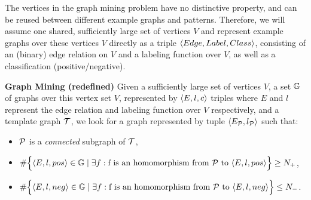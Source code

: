 
The vertices in the graph mining problem have no distinctive property, and can be reused between different example graphs and patterns.
Therefore, we will assume one shared, sufficiently large set of vertices $V$ and represent example graphs over these vertices $V$ directly as a triple $\langle Edge, Label, Class \rangle$, consisting of an (binary) edge relation on $V$ and a labeling function over $V$, as well as a classification (positive/negative).

\begin{definition} \textbf{Graph Mining (redefined)}
\label{def:gm2}
Given a sufficiently large set of vertices $V$, a set $\mathbb{G}$ of graphs over this vertex set $V$, represented by $\langle E, l, c \rangle$ triples
where $E$ and $l$ represent the edge relation and labeling function over $V$ respectively, and a template graph $\mathcal{T}$,
we look for a 
graph  represented by tuple $\langle E_{\mathcal{P}}, l_{\mathcal{P}} \rangle$ such that:

\begin{itemize}
\item $\mathcal{P}$ is a \emph{connected} subgraph of $\mathcal{T}$,
\item $\#\Big\lbrace \langle E,l,pos \rangle \in \mathbb{G} \; | \; \exists f : \text{f is an homomorphism from \ensuremath{\mathcal{P}} to \ensuremath{\langle E,l,pos \rangle}} \Big\rbrace \geq N_{+}$,

\item $\#\Big\lbrace \langle E,l,neg \rangle \in \mathbb{G} \; | \; \exists f : \text{f is an homomorphism from \ensuremath{\mathcal{P}} to \ensuremath{\langle E,l,neg \rangle}} \Big\rbrace \leq N_{-}$.
\end{itemize}
\end{definition}


